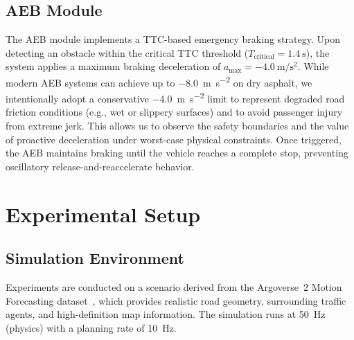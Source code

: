 \documentclass[conference]{IEEEtran}
\begin{document}
\subsection{AEB Module}
The AEB module implements a TTC-based emergency braking strategy. Upon detecting an obstacle within the critical TTC threshold ($T_{\text{critical}} = \SI{1.4}{\second}$), the system applies a maximum braking deceleration of $a_{\text{max}} = \SI{-4.0}{\meter\per\second\squared}$. While modern AEB systems can achieve up to \SI{-8.0}{\meter\per\second\squared} on dry asphalt, we intentionally adopt a conservative \SI{-4.0}{\meter\per\second\squared} limit to represent degraded road friction conditions (e.g., wet or slippery surfaces) and to avoid passenger injury from extreme jerk. This allows us to observe the safety boundaries and the value of proactive deceleration under worst-case physical constraints. Once triggered, the AEB maintains braking until the vehicle reaches a complete stop, preventing oscillatory release-and-reaccelerate behavior.

\section{Experimental Setup}

\subsection{Simulation Environment}
Experiments are conducted on a scenario derived from the Argoverse~2 Motion Forecasting dataset~\cite{argoverse2}, which provides realistic road geometry, surrounding traffic agents, and high-definition map information. The simulation runs at \SI{50}{\hertz} (physics) with a planning rate of \SI{10}{\hertz}.
\end{document}
